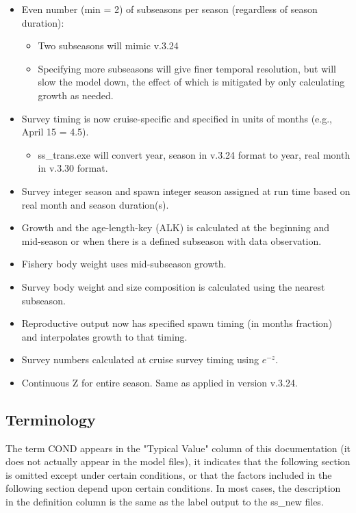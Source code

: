 	\begin{itemize}
		\item Even number (min = 2) of subseasons per season (regardless of season duration):
			\begin{itemize}
				\item Two subseasons will mimic v.3.24
				\item Specifying more subseasons will give finer temporal resolution, but will slow the model down, the effect of which is mitigated by only calculating growth as needed.
			\end{itemize}
		\item Survey timing is now cruise-specific and specified in units of months (e.g., April 15 = 4.5).
			\begin{itemize}
				\item ss\_trans.exe will convert year, season in v.3.24 format to year, real month in v.3.30 format.
			\end{itemize}
		\item Survey integer season and spawn integer season assigned at run time based on real month and season duration(s).
		\item Growth and the age-length-key (ALK) is calculated at the beginning and mid-season or when there is a defined subseason with data observation.
		\item Fishery body weight uses mid-subseason growth.
		\item Survey body weight and size composition is calculated using the nearest subseason.
		\item Reproductive output now has specified spawn timing (in months fraction) and interpolates growth to that timing.
		\item Survey numbers calculated at cruise survey timing using $e^{-z}$.
		\item Continuous Z for entire season.  Same as applied in version v.3.24.
	\end{itemize}

\subsection{Terminology}
The term COND appears in the "Typical Value" column of this documentation (it does not actually appear in the model files), it indicates that the following section is omitted except under certain conditions, or that the factors included in the following section depend upon certain conditions. In most cases, the description in the definition column is the same as the label output to the ss\_new files.

